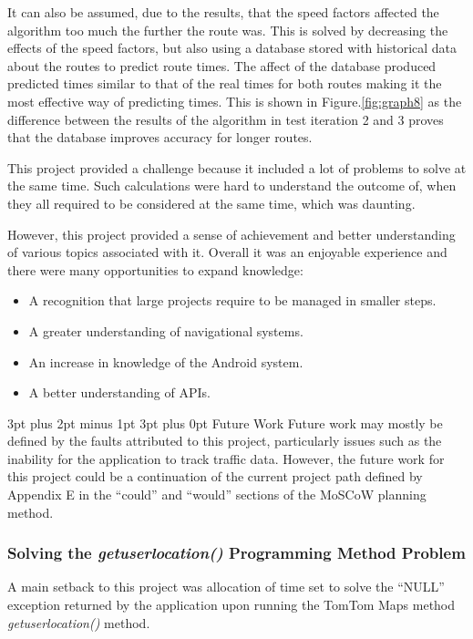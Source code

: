 \documentclass[12pt,a4paper]{article}
\makeatletter
\renewcommand\subsection{\@startsection {subsection}{1}{0mm} %
                               {3pt plus 2pt minus 1pt} %
                               {3pt plus 0pt} %
                               {\normalfont\bfseries}}
\makeatother
\begin{document}
 It can also be assumed, due to the results, that the speed factors affected the algorithm too much the further the route was. This is solved by decreasing the effects of the speed factors, but also using a database stored with historical data about the routes to predict route times. The affect of the database produced predicted times similar to that of the real times for both routes making it the most effective way of predicting times. This is shown in Figure.\ref{fig:graph8} as the difference between the results of the algorithm in test iteration 2 and 3 proves that the database improves accuracy for longer routes.
 
 This project provided a challenge because it included a lot of problems to solve at the same time. Such calculations were hard to understand the outcome of, when they all required to be considered at the same time, which was daunting.
 
 However, this project provided a sense of achievement and better understanding of various topics associated with it. Overall it was an enjoyable experience and there were many opportunities to expand knowledge: 
 
 \begin{itemize}
 	\item A recognition that large projects require to be managed in smaller steps.
 	\item A greater understanding of navigational systems.
 	\item An increase in knowledge of the Android system.
 	\item A better understanding of APIs.
 \end{itemize}


\subsection{Future Work}
Future work may mostly be defined by the faults attributed to this project, particularly issues such as the inability for the application to track traffic data. However, the future work for this project could be a continuation of the current project path defined by Appendix E in the \enquote{could} and \enquote{would} sections of the MoSCoW planning method.

\subsubsection{Solving the \textit{getuserlocation()} Programming Method Problem}
A main setback to this project was allocation of time set to solve the \enquote{NULL} exception returned by the application upon running the TomTom Maps method \textit{getuserlocation()} method. 
\end{document}
